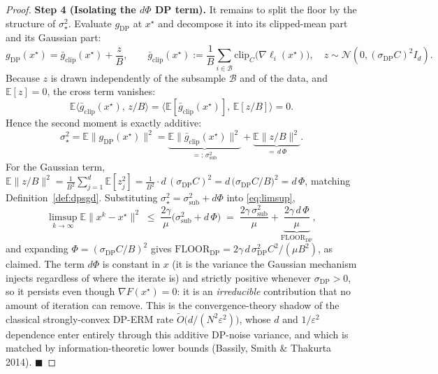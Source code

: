 \begin{proof}
\medskip
\noindent\textbf{Step 4 (Isolating the $d\Phi$ DP term).}
It remains to split the floor by the structure of $\sigma_\star^2$. Evaluate $g_{\mathrm{DP}}$ at $x^\star$ and decompose it into its clipped-mean part and its Gaussian part:
\[
g_{\mathrm{DP}}(x^\star)=\bar g_{\mathrm{clip}}(x^\star)+\frac{z}{B},\qquad
\bar g_{\mathrm{clip}}(x^\star):=\frac1B\sum_{i\in\mathcal B}\mathrm{clip}_C\big(\nabla\ell_i(x^\star)\big),\quad z\sim\mathcal N(0,(\sigma_{\mathrm{DP}}C)^2 I_d).
\]
Because $z$ is drawn independently of the subsample $\mathcal B$ and of the data, and $\mathbb E[z]=0$, the cross term vanishes:
\[
\mathbb E\big\langle \bar g_{\mathrm{clip}}(x^\star),\,z/B\big\rangle
=\big\langle \mathbb E[\bar g_{\mathrm{clip}}(x^\star)],\,\mathbb E[z/B]\big\rangle=0 .
\]
Hence the second moment is exactly additive:
\[
\sigma_\star^2=\mathbb E\|g_{\mathrm{DP}}(x^\star)\|^2
=\underbrace{\mathbb E\|\bar g_{\mathrm{clip}}(x^\star)\|^2}_{=:\,\sigma_{\mathrm{sub}}^2}
+\underbrace{\mathbb E\|z/B\|^2}_{=\,d\,\Phi}.
\]
For the Gaussian term, $\mathbb E\|z/B\|^2=\tfrac1{B^2}\sum_{j=1}^d \mathbb E[z_j^2]=\tfrac1{B^2}\cdot d\,(\sigma_{\mathrm{DP}}C)^2=d\,\big(\sigma_{\mathrm{DP}}C/B\big)^2=d\,\Phi$, matching Definition~\ref{def:dpsgd}. Substituting $\sigma_\star^2=\sigma_{\mathrm{sub}}^2+d\Phi$ into \eqref{eq:limsup},
\[
\limsup_{k\to\infty}\mathbb E\|x^k-x^\star\|^2
\;\le\;\frac{2\gamma}{\mu}\big(\sigma_{\mathrm{sub}}^2+d\,\Phi\big)
\;=\;\frac{2\gamma\,\sigma_{\mathrm{sub}}^2}{\mu}+\underbrace{\frac{2\gamma\,d\,\Phi}{\mu}}_{\mathrm{FLOOR}_{\mathrm{DP}}},
\]
and expanding $\Phi=(\sigma_{\mathrm{DP}}C/B)^2$ gives $\mathrm{FLOOR}_{\mathrm{DP}}=2\gamma\,d\,\sigma_{\mathrm{DP}}^2C^2/(\mu B^2)$, as claimed. The term $d\Phi$ is constant in $x$ (it is the variance the Gaussian mechanism injects regardless of where the iterate is) and strictly positive whenever $\sigma_{\mathrm{DP}}>0$, so it persists even though $\nabla F(x^\star)=0$: it is an \emph{irreducible} contribution that no amount of iteration can remove. This is the convergence-theory shadow of the classical strongly-convex DP-ERM rate $\widetilde O\!\big(d/(N^2\varepsilon^2)\big)$, whose $d$ and $1/\varepsilon^2$ dependence enter entirely through this additive DP-noise variance, and which is matched by information-theoretic lower bounds (Bassily, Smith \& Thakurta 2014). \hfill$\blacksquare$


\end{proof}
